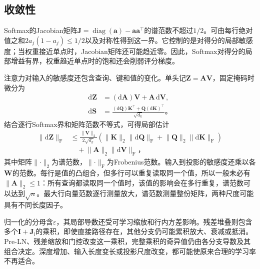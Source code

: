\subsection{收敛性}
\label{sec:transformer-convergence}

Softmax的Jacobian矩阵$\bm J=\operatorname{diag}(\bm a)-\bm a\bm a^{\top}$的谱范数不超过$1/2$。可由每行绝对值之和$2a_j(1-a_j)\leq1/2$以及对称性得到这一界。它控制的是对得分的局部敏感度；当权重接近单点时，Jacobian矩阵还可能趋近零。因此，Softmax对得分的局部增益有界，权重趋近单点时的饱和还会削弱评分梯度。

注意力对输入的敏感度还包含查询、键和值的变化。单头记$\bm Z=\bm A\bm V$，固定掩码时微分为
\begin{equation}
  \begin{aligned}
    \mathrm d\bm Z&=(\mathrm d\bm A)\bm V+\bm A\,\mathrm d\bm V,\\
    \mathrm d\bm S&=\frac{(\mathrm d\bm Q)\bm K^{\top}
                              +\bm Q(\mathrm d\bm K)^{\top}}{\sqrt{d_k}}\text{。}
  \end{aligned}
  \label{eq:transformer-attention-differential}
\end{equation}
结合逐行Softmax界和矩阵范数不等式，可得局部估计
\begin{equation}
  \begin{aligned}
    \lVert\mathrm d\bm Z\rVert_{\mathrm F}
    &\leq\frac{\lVert\bm V\rVert_2}{2\sqrt{d_k}}
       \left(\lVert\bm K\rVert_2\lVert\mathrm d\bm Q\rVert_{\mathrm F}
             +\lVert\bm Q\rVert_2\lVert\mathrm d\bm K\rVert_{\mathrm F}\right)\\
    &\quad+\lVert\bm A\rVert_2\lVert\mathrm d\bm V\rVert_{\mathrm F}\text{，}
  \end{aligned}
  \label{eq:transformer-attention-local-bound}
\end{equation}
其中矩阵$\lVert\cdot\rVert_2$为谱范数，$\lVert\cdot\rVert_{\mathrm F}$为Frobenius范数。输入到投影的敏感度还乘以各$\bm W$的范数。每行是值的凸组合，但多行可以重复读取同一个值，所以一般未必有$\lVert\bm A\rVert_2\leq1$：所有查询都读取同一个值时，该值的影响会在多行重复，谱范数可以达到$\sqrt n$。最大行向量范数逐行测量放大，谱范数测量整份矩阵，两种尺度可能具有不同长度因子。

归一化的分母含$\varepsilon$，其局部导数还受可学习缩放和行内方差影响。残差堆叠则包含多个$\bm I+\bm J_l$的乘积，即使直接路径存在，其他分支仍可能累积放大、衰减或抵消。Pre-LN、残差缩放和门控改变这一乘积，完整乘积的奇异值仍由各分支导数及其组合决定。深度增加、输入长度变长或投影尺度改变，都可能使原来合理的学习率不再适合。

